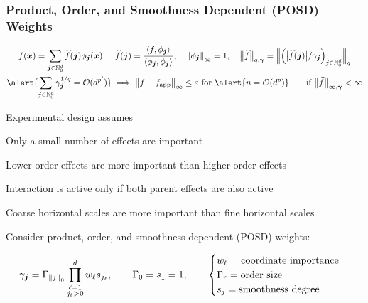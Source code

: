 \documentclass[11pt,compress,xcolor={usenames,dvipsnames},aspectratio=169]{beamer}
\newcommand{\fappx}{f_{\text{app}}}
\begin{document}
\begin{frame}
\frametitle{Product, Order, and Smoothness Dependent (POSD) Weights}
\vspace{-7ex}
\begin{gather*}
f(\vx) = \sum_{\vj \in \natzero^d} \hf(\vj) \phi_{\vj}(\vx), \quad\hf(\vj) = \frac{\ip{f}{\phi_{\vj}}}{\ip{\phi_{\vj}}{\phi_{\vj}}}, 
\quad \norm[\infty]{\phi_{\vj}}=1, \quad
\bignorm[q,\vgamma]{\hf} = \Bignorm[q]{\left( \bigabs{\hf(\vj)}/\gamma_{\vj} \right)_{\vj \in \natzero^d}}
\\
\alert{\sum_{\vj \in \natzero^d} \gamma_{\vj}^{1/q} = \Order(d^{p'})}\implies \bignorm[\infty]{f - \fappx}  \le \varepsilon \text{ for } \alert{n = \Order(d^{p})} \qquad \text{if } \bignorm[\infty,\vgamma]{\hf} < \infty
\end{gather*}

\vspace{-3.5ex}

Experimental design assumes\addtocounter{footnote}{1}

\vspace{-3ex}
\begin{description}
	\setlength{\parskip}{-0.5ex}
	\item[\quad Effect sparsity:] Only a small number of effects are important
	\item[\quad Effect hierarchy:] Lower-order effects are more important than higher-order effects
	\item[\quad Effect heredity:] Interaction is active only if both parent effects are also active
	\item[\quad Effect smoothness:]  Coarse horizontal scales are more important than fine horizontal scales
\end{description}
\vspace{-3ex}

Consider \alert{product, order, and smoothness dependent (POSD) weights}:

\vspace{-5ex}
\begin{equation*}
\gamma_{\vj} = \Gamma_{\norm[0]{\vj}} \prod_{\substack{\ell = 1 \\ j_\ell > 0}}^d w_{\ell} s_{j_\ell}, \qquad \Gamma_0 = s_1 = 1, \qquad 
\begin{cases}
w_\ell = \text{coordinate importance} \\
\Gamma_r = \text{order size} \\
s_j =  \text{smoothness degree}
\end{cases}
\end{equation*}

\end{frame}
\end{document}
